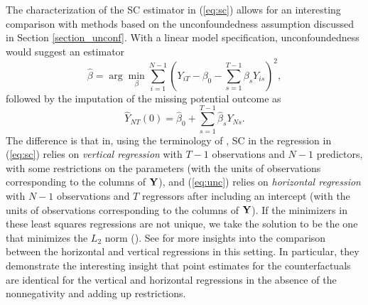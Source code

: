 \documentclass[letterpaper,12pt,leqno]{article}
\newcommand{\by}{{\bf Y}}
\begin{document}
The characterization of the SC estimator in (\ref{eq:sc}) allows for an interesting comparison with methods based on the unconfoundedness assumption discussed in Section \ref{section_unconf}. With a linear model specification, unconfoundedness would suggest an estimator
\begin{equation}\label{eq:unc}\hat\beta=\arg\min_{\beta}\sum_{i=1}^{N-1} \left(Y_{iT}-\beta_0-\sum_{s=1}^{T-1} \beta_s Y_{is}\right)^2,\end{equation}
followed by the imputation of the missing potential outcome as
\[\hat Y_{NT}(0)=\hat\beta_0+\sum_{s=1}^{T-1} \hat\beta_s Y_{Ns}.\]
The difference is that in, using the terminology of \citep*{athey2021matrix}, SC in the regression in (\ref{eq:sc}) relies on \emph{vertical regression} with $T-1$ observations and $N-1$ predictors, with some restrictions on the parameters  (with the units of observations corresponding to the columns of $\by$), and (\ref{eq:unc}) relies on \emph{horizontal regression} with $N-1$ observations and $T$ regressors after including an intercept (with the units of observations corresponding to the columns of $\by$).
If the minimizers in these least squares regressions are not unique, we take the solution to be the one that minimizes the $L_2$ norm (\citealp{spiess2023double}). See \citep*{shen2022tale} for more insights into the comparison between the horizontal and vertical regressions in this setting.  In particular, they demonstrate the interesting insight that point estimates for the counterfactuals are identical for the vertical and horizontal regressions in the absence of the nonnegativity and adding up restrictions.
\end{document}
